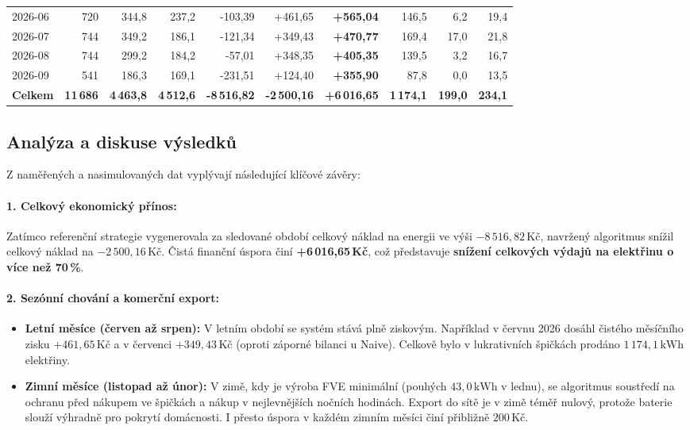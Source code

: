 \documentclass[FM,BP]{tulthesis}
\begin{document}
\begin{table}[htbp]
{\begin{tabular}{lrrrrrrrrr}
			2026-06 & 720 & 344{,}8 & 237{,}2 & -103{,}39 & +461{,}65 & \textbf{+565{,}04} & 146{,}5 & 6{,}2 & 19{,}4 \\
			2026-07 & 744 & 349{,}2 & 186{,}1 & -121{,}34 & +349{,}43 & \textbf{+470{,}77} & 169{,}4 & 17{,}0 & 21{,}8 \\
			2026-08 & 744 & 299{,}2 & 184{,}2 & -57{,}01 & +348{,}35 & \textbf{+405{,}35} & 139{,}5 & 3{,}2 & 16{,}7 \\
			2026-09 & 541 & 186{,}3 & 169{,}1 & -231{,}51 & +124{,}40 & \textbf{+355{,}90} & 87{,}8 & 0{,}0 & 13{,}5 \\
			\midrule
			\textbf{Celkem} & \textbf{11\,686} & \textbf{4\,463{,}8} & \textbf{4\,512{,}6} & \textbf{-8\,516{,}82} & \textbf{-2\,500{,}16} & \textbf{+6\,016{,}65} & \textbf{1\,174{,}1} & \textbf{199{,}0} & \textbf{234{,}1} \\
			\bottomrule
		\end{tabular}%
		}
	\end{table}

	\subsection{Analýza a diskuse výsledků}
	Z naměřených a nasimulovaných dat vyplývají následující klíčové závěry:

	\paragraph{1. Celkový ekonomický přínos:}
	Zatímco referenční strategie vygenerovala za sledované období celkový náklad na energii ve výši $-8\,516{,}82\,\text{Kč}$, navržený algoritmus snížil celkový náklad na $-2\,500{,}16\,\text{Kč}$. Čistá finanční úspora činí \textbf{+6\,016{,}65\,Kč}, což představuje \textbf{snížení celkových výdajů na elektřinu o více než 70\,\%}.

	\paragraph{2. Sezónní chování a komerční export:}
	\begin{itemize}
		\item \textbf{Letní měsíce (červen až srpen):} V letním období se systém stává plně ziskovým. Například v červnu 2026 dosáhl čistého měsíčního zisku $+461{,}65\,\text{Kč}$ a v červenci $+349{,}43\,\text{Kč}$ (oproti záporné bilanci u Naive). Celkově bylo v lukrativních špičkách prodáno $1\,174{,}1\,\text{kWh}$ elektřiny.
		\item \textbf{Zimní měsíce (listopad až únor):} V zimě, kdy je výroba FVE minimální (pouhých $43{,}0\,\text{kWh}$ v lednu), se algoritmus soustředí na ochranu před nákupem ve špičkách a nákup v nejlevnějších nočních hodinách. Export do sítě je v zimě téměř nulový, protože baterie slouží výhradně pro pokrytí domácnosti. I přesto úspora v každém zimním měsíci činí přibližně $200\,\text{Kč}$.
	\end{itemize}
\end{document}
